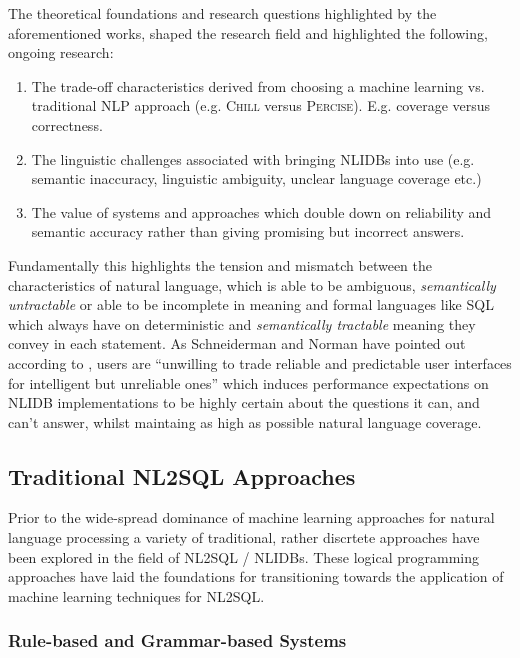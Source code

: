 \documentclass{article}
\begin{document}
The theoretical foundations and research questions highlighted by the aforementioned works, shaped the research
field and highlighted the following, ongoing research:

\begin{enumerate}
    \item The trade-off characteristics derived from choosing a machine learning vs. traditional NLP approach (e.g. 
          \textsc{Chill} versus \textsc{Percise}). E.g. coverage versus correctness. \citep{ILPParsing, NLIDBTheory}
    \item The linguistic challenges associated with bringing NLIDBs into use (e.g. semantic inaccuracy, linguistic 
          ambiguity, unclear language coverage etc.) \citep{NLIDBs}
    \item The value of systems and approaches which double down on reliability and semantic accuracy rather than giving
          promising but incorrect answers. \citep{NLIDBs, NLIDBTheory}
\end{enumerate}

Fundamentally this highlights the tension and mismatch between the characteristics of natural language, which is 
able to be ambiguous, \textit{semantically untractable} or able to be incomplete in meaning and formal languages
like SQL which always have on deterministic and \textit{semantically tractable} meaning they convey in each statement. 
As Schneiderman and Norman have pointed out according to \citeauthor*{NLIDBTheory}, users are ``unwilling to trade 
reliable and predictable user interfaces for intelligent but unreliable ones'' which induces performance expectations
on NLIDB implementations to be highly certain about the questions it can, and can't answer, whilst maintaing as high
as possible natural language coverage. \citep{NLIDBTheory}

\subsection{Traditional NL2SQL Approaches}

Prior to the wide-spread dominance of machine learning approaches for natural language processing a variety of
traditional, rather discrtete approaches have been explored in the field of NL2SQL / NLIDBs. These logical
programming approaches have laid the foundations for transitioning towards the application of machine learning
techniques for NL2SQL.

\subsubsection{Rule-based and Grammar-based Systems}
\end{document}

